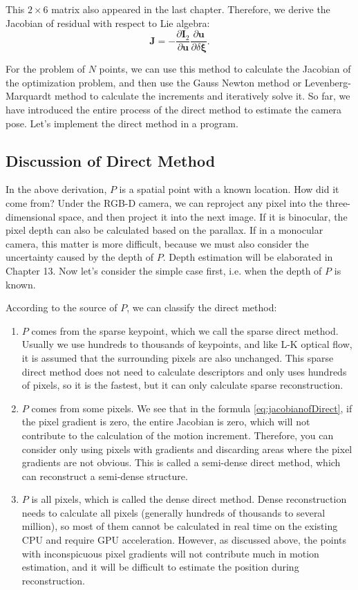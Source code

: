 {This $2 \times 6$ matrix also appeared in the last chapter. Therefore, we derive the Jacobian of residual with respect to Lie algebra:
\begin{equation}
\label{eq:jacobianofDirect}
\bm{J} =  - \frac{{\partial { \bm{I}_2}}}{{\partial \bm{u}}}\frac{{\partial \bm{u}}}{{\partial \delta \bm{\xi} }}.
\end{equation}

For the problem of $N$ points, we can use this method to calculate the Jacobian of the optimization problem, and then use the Gauss Newton method or Levenberg-Marquardt method to calculate the increments and iteratively solve it. So far, we have introduced the entire process of the direct method to estimate the camera pose. Let's implement the direct method in a program.

\subsection{Discussion of Direct Method}
In the above derivation, $P$ is a spatial point with a known location. How did it come from? Under the RGB-D camera, we can reproject any pixel into the three-dimensional space, and then project it into the next image. If it is binocular, the pixel depth can also be calculated based on the parallax. If in a monocular camera, this matter is more difficult, because we must also consider the uncertainty caused by the depth of $P$. Depth estimation will be elaborated in Chapter 13. Now let's consider the simple case first, i.e. when the depth of $P$ is known.

According to the source of $P$, we can classify the direct method:
\begin{enumerate}
	\item $P$ comes from the sparse keypoint, which we call the sparse direct method. Usually we use hundreds to thousands of keypoints, and like L-K optical flow, it is assumed that the surrounding pixels are also unchanged. This sparse direct method does not need to calculate descriptors and only uses hundreds of pixels, so it is the fastest, but it can only calculate sparse reconstruction.
	\item $P$ comes from some pixels. We see that in the formula \eqref{eq:jacobianofDirect}, if the pixel gradient is zero, the entire Jacobian is ​​zero, which will not contribute to the calculation of the motion increment. Therefore, you can consider only using pixels with gradients and discarding areas where the pixel gradients are not obvious. This is called a semi-dense direct method, which can reconstruct a semi-dense structure.
	\item $P$ is all pixels, which is called the dense direct method. Dense reconstruction needs to calculate all pixels (generally hundreds of thousands to several million), so most of them cannot be calculated in real time on the existing CPU and require GPU acceleration. However, as discussed above, the points with inconspicuous pixel gradients will not contribute much in motion estimation, and it will be difficult to estimate the position during reconstruction.
\end{enumerate}

}
